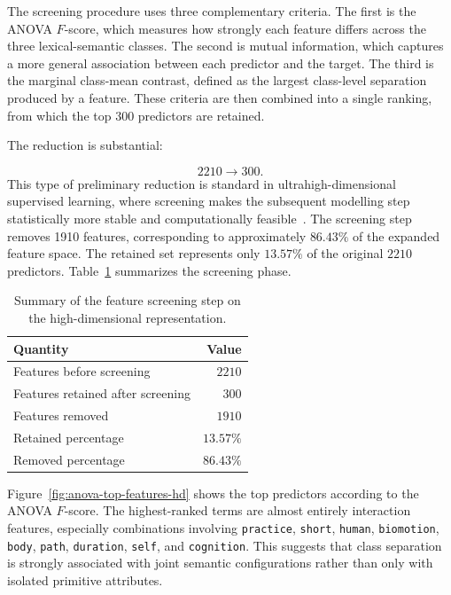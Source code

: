 \documentclass{ipgpmaster}
\begin{document}
The screening procedure uses three complementary criteria. The first is the ANOVA \(F\)-score, which measures how strongly each feature differs across the three lexical-semantic classes. The second is mutual information, which captures a more general association between each predictor and the target. The third is the marginal class-mean contrast, defined as the largest class-level separation produced by a feature. These criteria are then combined into a single ranking, from which the top \(300\) predictors are retained.

The reduction is substantial:

\[
2210 \longrightarrow 300.
\]
This type of preliminary reduction is standard in ultrahigh-dimensional supervised learning, where screening makes the subsequent modelling step statistically more stable and computationally feasible~\cite{fan2008sure,fan2009ultrahigh,nandy2022covariate}.
The screening step removes 1910 features, corresponding to approximately \(86.43\%\) of the expanded feature space. The retained set represents only \(13.57\%\) of the original \(2210\) predictors. Table~\ref{tab:screening-summary-hd} summarizes the screening phase.

\begin{table}[H]
\centering
\begin{tabular}{lr}
\hline
\textbf{Quantity} & \textbf{Value} \\
\hline
Features before screening & \(2210\) \\
Features retained after screening & \(300\) \\
Features removed & \(1910\) \\
Retained percentage & \(13.57\%\) \\
Removed percentage & \(86.43\%\) \\
\hline
\end{tabular}
\caption{Summary of the feature screening step on the high-dimensional representation.}
\label{tab:screening-summary-hd}
\end{table}

Figure~\ref{fig:anova-top-features-hd} shows the top predictors according to the ANOVA \(F\)-score. The highest-ranked terms are almost entirely interaction features, especially combinations involving \texttt{practice}, \texttt{short}, \texttt{human}, \texttt{biomotion}, \texttt{body}, \texttt{path}, \texttt{duration}, \texttt{self}, and \texttt{cognition}. This suggests that class separation is strongly associated with joint semantic configurations rather than only with isolated primitive attributes.
\end{document}
